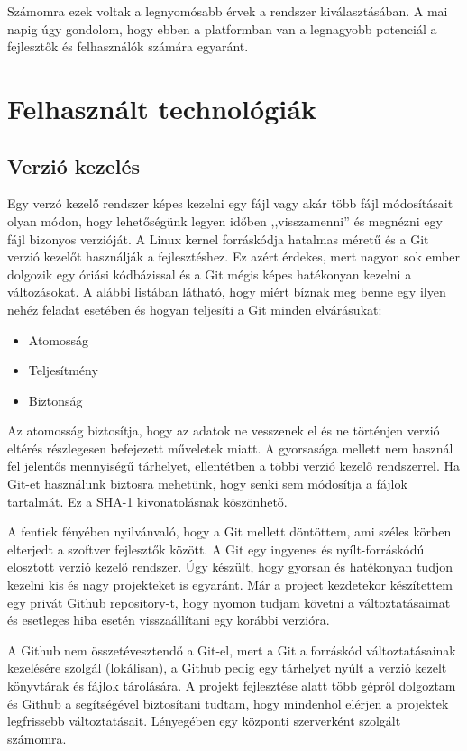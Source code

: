 \documentclass{thesis-ekf}
\theoremstyle{definition}
\theoremstyle{remark}
\begin{document}
Számomra ezek voltak a legnyomósabb érvek a rendszer kiválasztásában.
A mai napig úgy gondolom, hogy ebben a platformban van a legnagyobb potenciál a fejlesztők és felhasználók számára egyaránt.

\chapter{Felhasznált technológiák}\label{technologiak}

\section{Verzió kezelés}

Egy verzó kezelő rendszer képes kezelni egy fájl vagy akár több fájl módosításait olyan módon, hogy lehetőségünk legyen időben ,,visszamenni'' és megnézni egy fájl bizonyos verzióját.
A Linux kernel forráskódja hatalmas méretű és a Git verzió kezelőt használják a fejlesztéshez.
Ez azért érdekes, mert nagyon sok ember dolgozik egy óriási kódbázissal és a Git mégis képes hatékonyan kezelni a változásokat.
A alábbi listában látható, hogy miért bíznak meg benne egy ilyen nehéz feladat esetében és hogyan teljesíti a Git minden elvárásukat:

\begin{itemize}
	\item Atomosság
	\item Teljesítmény
	\item Biztonság
\end{itemize}

Az atomosság biztosítja, hogy az adatok ne vesszenek el és ne történjen verzió eltérés részlegesen befejezett műveletek miatt.
A gyorsasága mellett nem használ fel jelentős mennyiségű tárhelyet, ellentétben a többi verzió kezelő rendszerrel.
Ha Git-et használunk biztosra mehetünk, hogy senki sem módosítja a fájlok tartalmát. Ez a SHA-1 kivonatolásnak köszönhető.\cite{git}

A fentiek fényében nyilvánvaló, hogy a Git mellett döntöttem, ami széles körben elterjedt a szoftver fejlesztők között.
A Git egy ingyenes és nyílt-forráskódú elosztott verzió kezelő rendszer. Úgy készült, hogy gyorsan és hatékonyan tudjon kezelni kis és nagy projekteket is egyaránt.
Már a project kezdetekor készítettem egy privát Github repository-t, hogy nyomon tudjam követni a változtatásaimat és esetleges hiba esetén visszaállítani egy korábbi verzióra.

A Github nem összetévesztendő a Git-el, mert a Git a forráskód változtatásainak kezelésére szolgál (lokálisan), a Github pedig egy tárhelyet nyúlt a verzió kezelt könyvtárak és fájlok tárolására.
A projekt fejlesztése alatt több gépről dolgoztam és Github a segítségével biztosítani tudtam, hogy mindenhol elérjen a projektek legfrissebb változtatásait.
Lényegében egy központi szerverként szolgált számomra.
\end{document}
